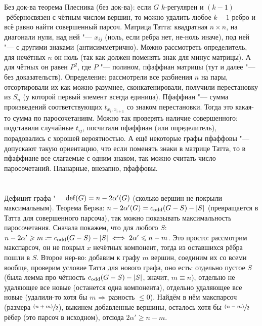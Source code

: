 	Без док-ва теорема Плесника (без док-ва): если $G$ $k$-регулярен и $(k-1)$-рёберносвязен с чётным числом вершин,
	то можно удалить любое $k-1$ ребро и всё равно найти совершенный парсоч.
	Матрица Татта: квадратная $n \times n$, на диагонали нули, над ней "--- $x_{ij}$ (ноль, если ребра нет, не-ноль иначе),
	под ней "--- с другими знаками (антисимметрично).
	Можно рассмотреть определитель, для нечётных $n$ он ноль (так как должен поменять знак для минус матрицы).
	А для чётных он равен $P^2$, где $P$ "--- полином, пфаффиан матрицы (тут и далее "--- без доказательств).
	Определение: рассмотрели все разбиения $n$ на пары, отсортировали их как можно разумнее,
	сконкатенировали, получили перестановку из $S_n$ (у которой первый элемент всегда единица).
	Пфаффиан "--- сумма произведений соответствующих $t_{x_i, x_{i+1}}$ со знаком перестановки.
	Тогда это какая-то сумма по паросочетаниям.
	Можно так проверять наличие совершенного: подставили случайные $t_{ij}$, посчитали пфаффиан (или определитель),
	порадовались с хорошей вероятностью.
	А ещё некоторые графы пфаффовы "--- допускают такую ориентацию, что если поменять знаки в матрице Татта,
	то в пфаффиане все слагаемые с одним знаком, так можно считать число паросочетаний.
	Планарные, внезапно, пфаффовы.

\section{} %
	Дефицит графа "--- $\mathrm{def}(G) = n-2\alpha'(G)$ (сколько вершин не покрыли максимальным).
	Теорема Бержа: $n-2\alpha'(G)=c_{\mathrm{odd}}(G-S) - |S|$ (превращается в Татта для совершенного парсоча),
	так можно показывать максимальность паросочетания.
	Сначала покажем, что для любого $S$: $n-2\alpha' \geqslant m \coloneq c_{\mathrm{odd}}(G-S)-|S| \iff 2\alpha' \leqslant n-m$.
	Это просто: рассмотрим макспарсоч, он не покрыл $x$ нечётных компонент, тогда из оставшихся рёбра пошли в $S$.
	Второе нер-во: добавим к графу $m$ вершин, соединим их со всеми вообще, проверим условие Татта для нового графа, оно есть:
	отдельно пустое $S$ (была лемма про чётность $c_{\mathrm{odd}}(G-S)-|S|$, значит, $m \equiv n$),
	отдельно не удаляющее все новые (останется одна компонента),
	отдельно удаляющее все новые (удалили-то хотя бы $m$ $\Rightarrow$ разность $\le 0$).
	Найдём в нём макспарсоч (размера $\sfrac{(n+m)}{2}$), выкинем добавленные вершины, осталось хотя бы $\sfrac{(n-m)}{2}$ рёбер (это парсоч в исходном),
	отсюда $2\alpha' \ge n-m$.
